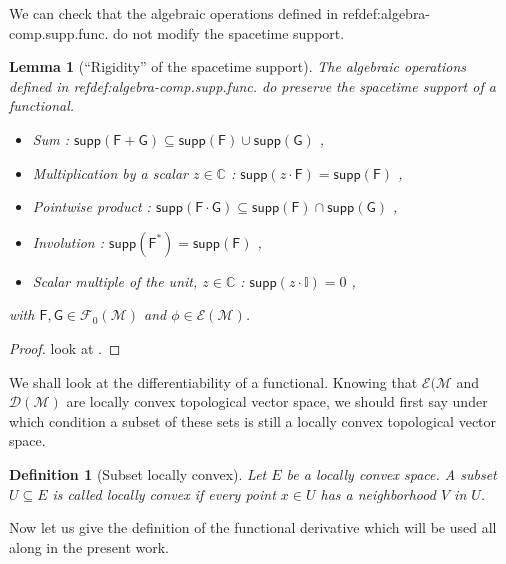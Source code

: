 \documentclass[10pt]{book}
\newcommand{\supp}{\mathsf{supp}}
\newcommand{\Dcal}{\mathcal{D}}
\newcommand{\Ecal}{\mathcal{E}}
\newcommand{\Fcal}{\mathcal{F}}
\newcommand{\Mcal}{\mathcal{M}}
\newcommand{\Cbb}{\mathbb{C}}
\newcommand{\Ibb}{\mathbb{I}}
\newcommand{\Fsf}{\mathsf{F}}
\newcommand{\Gsf}{\mathsf{G}}
\theoremstyle{break}
\newtheorem{lemma}{Lemma}
\newtheorem{definition}{Definition}
\begin{document}
We can check that the algebraic operations defined in ref{def:algebra-comp.supp.func.} do not modify the spacetime support.


\begin{lemma}[``Rigidity'' of the spacetime support]
The algebraic operations defined in ref{def:algebra-comp.supp.func.} do preserve the spacetime support of a functional. 
%
\begin{itemize}
\item Sum : $\supp(\Fsf + \Gsf) \subseteq \supp(\Fsf) \cup \supp(\Gsf)$ ,
\item Multiplication by a scalar $z\in\Cbb$ : $\supp(z\cdot\Fsf) = \supp(\Fsf)$ ,
\item Pointwise product : $\supp(\Fsf \cdot \Gsf) \subseteq \supp(\Fsf) \cap \supp(\Gsf)$ ,
\item Involution : $\supp(\Fsf^\ast) = \supp(\Fsf)$ ,
\item Scalar multiple of the unit, $z\in\Cbb$ : $\supp(z\cdot\Ibb) = 0 $ ,
\end{itemize}
%
with $\Fsf, \Gsf \in \Fcal_0(\Mcal)$ and $\phi \in \Ecal(\Mcal)$.
\end{lemma}


\begin{proof}
look at \cite[lemma 2.3.3]{brunetti_algebraic_2012}.
\end{proof}


We shall look at the differentiability of a functional. Knowing that $\Ecal(\Mcal$ and $\Dcal(\Mcal)$ are locally convex topological vector space, we should first say under which condition a subset of these sets is still a locally convex topological vector space.


\begin{definition}[Subset locally convex]
Let $E$ be a locally convex space. A subset $U \subseteq E$ is called locally convex if every point $x \in U$ has a neighborhood $V$ in $U$. 
\end{definition}


Now let us give the definition of the functional derivative which will be used all along in the present work.
\end{document}
